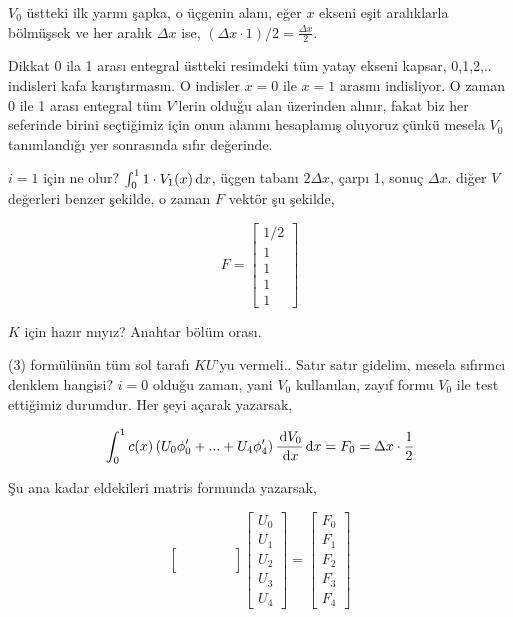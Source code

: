 \documentclass[12pt,fleqn]{article}\usepackage{../../common}
\begin{document}
$V_0$ üstteki ilk yarım şapka, o üçgenin alanı, eğer $x$ ekseni eşit aralıklarla
bölmüşsek ve her aralık $\Delta x$ ise, $(\Delta x \cdot 1) / 2 = \frac{\Delta x}{2}$.

Dikkat 0 ila 1 arası entegral üstteki resimdeki tüm yatay ekseni kapsar,
0,1,2,..  indisleri kafa karıştırmasın. O indisler $x=0$ ile $x=1$ arasını
indisliyor. O zaman 0 ile 1 arası entegral tüm $V$'lerin olduğu alan üzerinden
alınır, fakat biz her seferinde birini seçtiğimiz için onun alanını hesaplamış
oluyoruz çünkü mesela $V_0$ tanımlandığı yer sonrasında sıfır değerinde.

$i=1$ için ne olur? $\int_{0}^{1} 1 \cdot V_1(x) \,\mathrm{d} x$, üçgen tabanı
$2 \Delta x$,  çarpı 1, sonuç $\Delta x$. diğer $V$ değerleri benzer şekilde,
o zaman $F$ vektör şu şekilde,

$$
F = \left[\begin{array}{c}
1/2 \\ 1 \\ 1 \\ 1 \\ 1
\end{array}\right]
$$

$K$ için hazır mıyız? Anahtar bölüm orası.

(3) formülünün tüm sol tarafı $KU$'yu vermeli.. Satır satır gidelim, mesela
sıfırıncı denklem hangisi? $i=0$ olduğu zaman, yani $V_0$ kullanılan, zayıf
formu $V_0$ ile test ettiğimiz durumdur. Her şeyi açarak yazarsak,

$$
\int _{0}^{1} c(x)
\left( U_0 \phi_0' + ... + U_4 \phi_4'  \right)
\frac{\,\mathrm{d} V_0}{\,\mathrm{d} x} \,\mathrm{d} x = F_0 = \Delta x \cdot \frac{1}{2}
$$

Şu ana kadar eldekileri matris formunda yazarsak,

$$
\left[\begin{array}{rrrrr}
 & & & & \\
 & & & & \\
 & & & & \\
 & & & & 
\end{array}\right]
\left[\begin{array}{r}
U_0 \\ U_1 \\ U_2 \\ U_3 \\ U_4
\end{array}\right] =
\left[\begin{array}{r}
F_0 \\ F_1 \\ F_2 \\ F_3 \\ F_4
\end{array}\right]
$$
\end{document}
